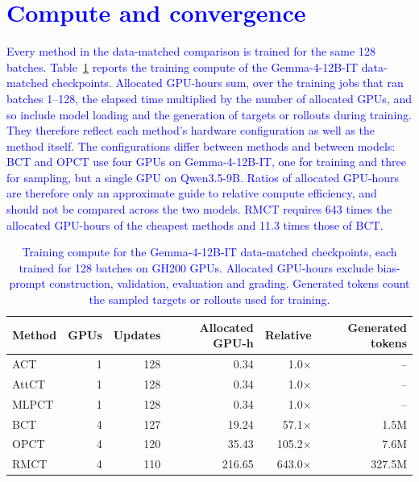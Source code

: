 \section{\texorpdfstring{\textcolor{blue}{Compute and convergence}}{Compute and convergence}}
\label{app:hyperparameters}
\textcolor{blue}{Every method in the data-matched comparison is trained for the same 128 batches.} \textcolor{blue}{Table~\ref{tab:compute-gemma128} reports the training compute of the Gemma-4-12B-IT data-matched checkpoints.} \textcolor{blue}{Allocated GPU-hours sum, over the training jobs that ran batches 1--128, the elapsed time multiplied by the number of allocated GPUs, and so include model loading and the generation of targets or rollouts during training.} \textcolor{blue}{They therefore reflect each method's hardware configuration as well as the method itself.} \textcolor{blue}{The configurations differ between methods and between models: BCT and OPCT use four GPUs on Gemma-4-12B-IT, one for training and three for sampling, but a single GPU on Qwen3.5-9B.} \textcolor{blue}{Ratios of allocated GPU-hours are therefore only an approximate guide to relative compute efficiency, and should not be compared across the two models.} \textcolor{blue}{RMCT requires 643 times the allocated GPU-hours of the cheapest methods and 11.3 times those of BCT.}

\begin{table}[!tp]\centering
\caption{\textcolor{blue}{Training compute for the Gemma-4-12B-IT data-matched checkpoints, each trained for 128 batches on GH200 GPUs.} \textcolor{blue}{Allocated GPU-hours exclude bias-prompt construction, validation, evaluation and grading.} \textcolor{blue}{Generated tokens count the sampled targets or rollouts used for training.}}
\label{tab:compute-gemma128}
\color{blue}\begin{tabular}{lrrrrr}\toprule
Method & GPUs & Updates & Allocated GPU-h & Relative & Generated tokens\\\midrule
ACT & 1 & 128 & 0.34 & 1.0$\times$ & --\\
AttCT & 1 & 128 & 0.34 & 1.0$\times$ & --\\
MLPCT & 1 & 128 & 0.34 & 1.0$\times$ & --\\
BCT & 4 & 127 & 19.24 & 57.1$\times$ & 1.5M\\
OPCT & 4 & 120 & 35.43 & 105.2$\times$ & 7.6M\\
RMCT & 4 & 110 & 216.65 & 643.0$\times$ & 327.5M\\\bottomrule
\end{tabular}\end{table}

